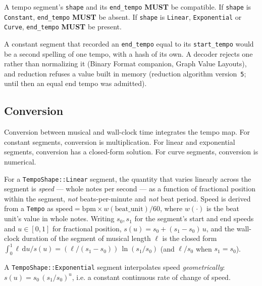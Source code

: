 \documentclass[11pt,letterpaper]{report}
\newcommand{\sectionsc}[1]{{\addfontfeatures{Letters=SmallCaps}#1}}
\newcounter{requirement}[chapter]
\newcommand{\MUST}{\textbf{MUST}}
\begin{document}
\begin{requirement}
  \label{req:time:tempo-segment-shape}
  A tempo segment's \texttt{shape} and its \texttt{end\_tempo} \MUST{} be
  compatible. If \texttt{shape} is \texttt{Constant}, \texttt{end\_tempo}
  \MUST{} be absent. If \texttt{shape} is \texttt{Linear},
  \texttt{Exponential} or \texttt{Curve}, \texttt{end\_tempo} \MUST{} be
  present.

  A constant segment that recorded an \texttt{end\_tempo} equal to its
  \texttt{start\_tempo} would be a second spelling of one tempo, with a hash of
  its own. A decoder rejects one rather than normalizing it (Binary Format
  companion, \sectionsc{Graph Value Layouts}), and reduction refuses a value
  built in memory (reduction algorithm version~\texttt{5}; until then an equal
  end tempo was admitted).
\end{requirement}

\subsection{Conversion}

Conversion between musical and wall-clock time integrates the tempo map.
For constant segments, conversion is multiplication. For linear and
exponential segments, conversion has a closed-form solution. For curve
segments, conversion is numerical.

\begin{requirement}
  \label{req:time:linear-interpolates-speed}
  For a \texttt{TempoShape::Linear} segment, the quantity that varies
  linearly across the segment is \emph{speed} --- whole notes per
  second --- as a function of fractional position within the segment,
  \emph{not} beats-per-minute and \emph{not} beat period. Speed is
  derived from a \texttt{Tempo} as
  $\text{speed} = \text{bpm} \times w(\text{beat\_unit}) / 60$, where
  $w(\cdot)$ is the beat unit's value in whole notes. Writing
  $s_0, s_1$ for the segment's start and end speeds and
  $u \in [0,1]$ for fractional position, $s(u) = s_0 + (s_1 - s_0)\,u$,
  and the wall-clock duration of the segment of musical length
  $\ell$ is the closed form
  $\int_0^1 \ell\,\mathrm{d}u / s(u) = (\ell / (s_1 - s_0))\,
  \ln(s_1 / s_0)$ (and $\ell / s_0$ when $s_1 = s_0$).

  A \texttt{TempoShape::Exponential} segment interpolates speed
  \emph{geometrically}: $s(u) = s_0\,(s_1/s_0)^{u}$, i.e. a constant
  continuous rate of change of speed.
\end{requirement}
\end{document}
